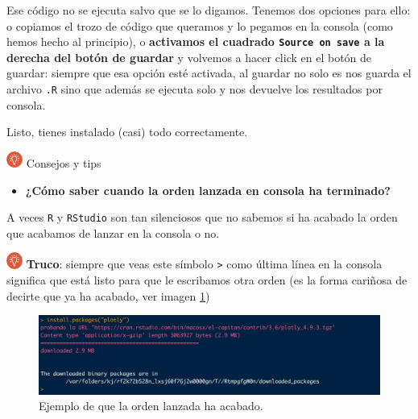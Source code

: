 \documentclass[11pt,]{book}
\providecommand{\tightlist}{%
  \setlength{\itemsep}{0pt}\setlength{\parskip}{0pt}}
\begin{document}
Ese código no se ejecuta salvo que se lo digamos. Tenemos dos opciones para ello: o copiamos el trozo de código que queramos y lo pegamos en la consola (como hemos hecho al principio), o \textbf{activamos el cuadrado \texttt{Source\ on\ save} a la derecha del botón de guardar} y volvemos a hacer click en el botón de guardar: siempre que esa opción esté activada, al guardar no solo es nos guarda el archivo \texttt{.R} sino que además se ejecuta solo y nos devuelve los resultados por consola.

Listo, tienes instalado (casi) todo correctamente.

\includegraphics[width=0.04\textwidth,height=\textheight]{img/logo_info.png} Consejos y tips

\begin{itemize}
\tightlist
\item
  \textbf{¿Cómo saber cuando la orden lanzada en consola ha terminado?}
\end{itemize}

A veces \texttt{R} y \texttt{RStudio} son tan silenciosos que no sabemos si ha acabado la orden que acabamos de lanzar en la consola o no.

\includegraphics[width=0.04\textwidth,height=\textheight]{img/logo_info.png} \textbf{Truco}: siempre que veas este símbolo \texttt{\textgreater{}} como última línea en la consola significa que está listo para que le escribamos otra orden (es la forma cariñosa de decirte que ya ha acabado, ver imagen \ref{fig:tip-consola-lista})

\begin{figure}

{\centering \includegraphics[width=0.7\linewidth]{./img/tip_consola_lista} 

}

\caption{Ejemplo de que la orden lanzada ha acabado.}\label{fig:tip-consola-lista}
\end{figure}

~

~
\end{document}
